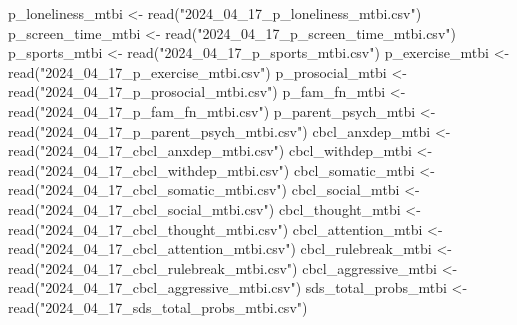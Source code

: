 \documentclass[
  letterpaper,
  DIV=11,
  numbers=noendperiod]{scrreprt}
\newenvironment{Shaded}{\begin{snugshade}}{\end{snugshade}}
\newcommand{\FunctionTok}[1]{\textcolor[rgb]{0.28,0.35,0.67}{#1}}
\newcommand{\NormalTok}[1]{\textcolor[rgb]{0.00,0.23,0.31}{#1}}
\newcommand{\OtherTok}[1]{\textcolor[rgb]{0.00,0.23,0.31}{#1}}
\newcommand{\StringTok}[1]{\textcolor[rgb]{0.13,0.47,0.30}{#1}}
\begin{document}
\begin{Shaded}
\begin{Highlighting}[]
\NormalTok{p\_loneliness\_mtbi }\OtherTok{\textless{}{-}} \FunctionTok{read}\NormalTok{(}\StringTok{"2024\_04\_17\_p\_loneliness\_mtbi.csv"}\NormalTok{)}
\NormalTok{p\_screen\_time\_mtbi }\OtherTok{\textless{}{-}} \FunctionTok{read}\NormalTok{(}\StringTok{"2024\_04\_17\_p\_screen\_time\_mtbi.csv"}\NormalTok{)}
\NormalTok{p\_sports\_mtbi }\OtherTok{\textless{}{-}} \FunctionTok{read}\NormalTok{(}\StringTok{"2024\_04\_17\_p\_sports\_mtbi.csv"}\NormalTok{)}
\NormalTok{p\_exercise\_mtbi }\OtherTok{\textless{}{-}} \FunctionTok{read}\NormalTok{(}\StringTok{"2024\_04\_17\_p\_exercise\_mtbi.csv"}\NormalTok{)}
\NormalTok{p\_prosocial\_mtbi }\OtherTok{\textless{}{-}} \FunctionTok{read}\NormalTok{(}\StringTok{"2024\_04\_17\_p\_prosocial\_mtbi.csv"}\NormalTok{)}
\NormalTok{p\_fam\_fn\_mtbi }\OtherTok{\textless{}{-}} \FunctionTok{read}\NormalTok{(}\StringTok{"2024\_04\_17\_p\_fam\_fn\_mtbi.csv"}\NormalTok{)}
\NormalTok{p\_parent\_psych\_mtbi }\OtherTok{\textless{}{-}} \FunctionTok{read}\NormalTok{(}\StringTok{"2024\_04\_17\_p\_parent\_psych\_mtbi.csv"}\NormalTok{)}
\NormalTok{cbcl\_anxdep\_mtbi }\OtherTok{\textless{}{-}} \FunctionTok{read}\NormalTok{(}\StringTok{"2024\_04\_17\_cbcl\_anxdep\_mtbi.csv"}\NormalTok{)}
\NormalTok{cbcl\_withdep\_mtbi }\OtherTok{\textless{}{-}} \FunctionTok{read}\NormalTok{(}\StringTok{"2024\_04\_17\_cbcl\_withdep\_mtbi.csv"}\NormalTok{)}
\NormalTok{cbcl\_somatic\_mtbi }\OtherTok{\textless{}{-}} \FunctionTok{read}\NormalTok{(}\StringTok{"2024\_04\_17\_cbcl\_somatic\_mtbi.csv"}\NormalTok{)}
\NormalTok{cbcl\_social\_mtbi }\OtherTok{\textless{}{-}} \FunctionTok{read}\NormalTok{(}\StringTok{"2024\_04\_17\_cbcl\_social\_mtbi.csv"}\NormalTok{)}
\NormalTok{cbcl\_thought\_mtbi }\OtherTok{\textless{}{-}} \FunctionTok{read}\NormalTok{(}\StringTok{"2024\_04\_17\_cbcl\_thought\_mtbi.csv"}\NormalTok{)}
\NormalTok{cbcl\_attention\_mtbi }\OtherTok{\textless{}{-}} \FunctionTok{read}\NormalTok{(}\StringTok{"2024\_04\_17\_cbcl\_attention\_mtbi.csv"}\NormalTok{)}
\NormalTok{cbcl\_rulebreak\_mtbi }\OtherTok{\textless{}{-}} \FunctionTok{read}\NormalTok{(}\StringTok{"2024\_04\_17\_cbcl\_rulebreak\_mtbi.csv"}\NormalTok{)}
\NormalTok{cbcl\_aggressive\_mtbi }\OtherTok{\textless{}{-}} \FunctionTok{read}\NormalTok{(}\StringTok{"2024\_04\_17\_cbcl\_aggressive\_mtbi.csv"}\NormalTok{)}
\NormalTok{sds\_total\_probs\_mtbi }\OtherTok{\textless{}{-}} \FunctionTok{read}\NormalTok{(}\StringTok{"2024\_04\_17\_sds\_total\_probs\_mtbi.csv"}\NormalTok{)}


\end{Highlighting}
\end{Shaded}
\end{document}
